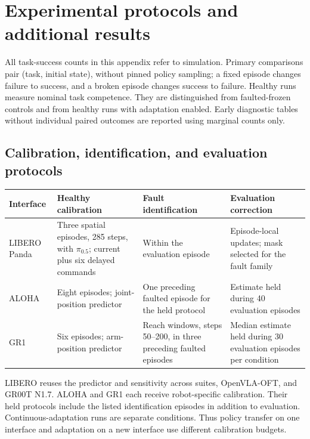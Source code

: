 \section{Experimental protocols and additional results}
\label{app:experiment}

All task-success counts in this appendix refer to simulation. Primary comparisons pair
(task, initial state), without pinned policy sampling; a fixed episode changes
failure to success, and a broken episode changes success to failure. Healthy runs measure nominal task competence. They
are distinguished from faulted-frozen controls and from healthy runs with adaptation
enabled. Early diagnostic tables without individual paired outcomes are reported using
marginal counts only.

\subsection{Calibration, identification, and evaluation protocols}
\label{app:protocols}

\begin{center}\small
\setlength{\tabcolsep}{4pt}
\begin{tabular}{>{\raggedright\arraybackslash}p{.17\linewidth}>{\raggedright\arraybackslash}p{.25\linewidth}>{\raggedright\arraybackslash}p{.22\linewidth}>{\raggedright\arraybackslash}p{.25\linewidth}}
\toprule
Interface & Healthy calibration & Fault identification & Evaluation correction\\
\midrule
LIBERO Panda & Three spatial episodes, 285 steps, with $\pi_{0.5}$; current plus six delayed commands & Within the evaluation episode & Episode-local updates; mask selected for the fault family\\[3pt]
ALOHA & Eight episodes; joint-position predictor & One preceding faulted episode for the held protocol & Estimate held during 40 evaluation episodes\\[3pt]
GR1 & Six episodes; arm-position predictor & Reach windows, steps 50--200, in three preceding faulted episodes & Median estimate held during 30 evaluation episodes per condition\\
\bottomrule
\end{tabular}
\end{center}
LIBERO reuses the predictor and sensitivity across suites, OpenVLA-OFT, and GR00T N1.7.
ALOHA and GR1 each receive robot-specific calibration. Their held protocols include the
listed identification episodes in addition to evaluation. Continuous-adaptation runs
are separate conditions. Thus policy transfer on one interface and adaptation on a
new interface use different calibration budgets.


